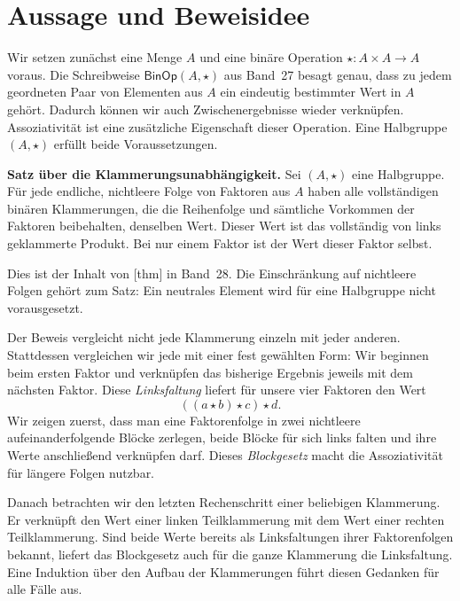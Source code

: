 \par{}
\section*{Aussage und Beweisidee}

Wir setzen zunächst eine Menge \(A\) und eine binäre Operation
\(\star\colon A\times A\to A\) voraus. Die Schreibweise
\(\mathsf{BinOp}(A,\star)\) aus Band~27 besagt genau, dass zu
jedem geordneten Paar von Elementen aus \(A\) ein eindeutig bestimmter
Wert in \(A\) gehört. Dadurch können wir auch Zwischenergebnisse wieder
verknüpfen. Assoziativität ist eine zusätzliche Eigenschaft dieser
Operation. Eine Halbgruppe \((A,\star)\) erfüllt beide Voraussetzungen.

\medskip\noindent\textbf{Satz über die Klammerungsunabhängigkeit.}
Sei \((A,\star)\) eine Halbgruppe. Für jede endliche, nichtleere
Folge von Faktoren aus \(A\) haben alle vollständigen binären
Klammerungen, die die Reihenfolge und sämtliche Vorkommen der Faktoren
beibehalten, denselben Wert. Dieser Wert ist das vollständig von links
geklammerte Produkt. Bei nur einem Faktor ist der Wert dieser Faktor selbst.

Dies ist der Inhalt von
[thm] in Band~28.
Die Einschränkung auf nichtleere Folgen gehört zum Satz: Ein neutrales
Element wird für eine Halbgruppe nicht vorausgesetzt.

Der Beweis vergleicht nicht jede Klammerung einzeln mit jeder anderen.
Stattdessen vergleichen wir jede mit einer fest gewählten Form: Wir
beginnen beim ersten Faktor und verknüpfen das bisherige Ergebnis
jeweils mit dem nächsten Faktor. Diese \emph{Linksfaltung} liefert
für unsere vier Faktoren den Wert
\[
  ((a\star b)\star c)\star d.
\]
Wir zeigen zuerst, dass man eine Faktorenfolge in zwei nichtleere
aufeinanderfolgende Blöcke zerlegen, beide Blöcke für sich links falten
und ihre Werte anschließend verknüpfen darf. Dieses \emph{Blockgesetz}
macht die Assoziativität für längere Folgen nutzbar.

Danach betrachten wir den letzten Rechenschritt einer beliebigen
Klammerung. Er verknüpft den Wert einer linken Teilklammerung mit dem
Wert einer rechten Teilklammerung. Sind beide Werte bereits als
Linksfaltungen ihrer Faktorenfolgen bekannt, liefert das Blockgesetz
auch für die ganze Klammerung die Linksfaltung. Eine Induktion über den
Aufbau der Klammerungen führt diesen Gedanken für alle Fälle aus.

